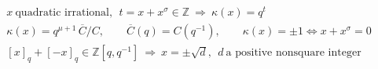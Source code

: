 \documentclass{article}
\begin{document}
\[
\begin{aligned}
&x\ \text{quadratic irrational},\ \ t=x+x^{\sigma}\in\mathbb{Z}\ \Longrightarrow\ \kappa(x)=q^{t}\\
&\kappa(x)=q^{\mu+1}\,\overline{C}/C,\qquad \overline{C}(q)=C(q^{-1}),\qquad \kappa(x)=\pm1\iff x+x^{\sigma}=0\\
&[x]_q+[-x]_q\in\mathbb{Z}[q,q^{-1}]\ \Longrightarrow\ x=\pm\sqrt{d},\ \ d\ \text{a positive nonsquare integer}
\end{aligned}
\]
\end{document}
